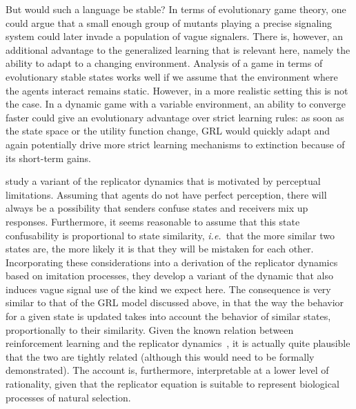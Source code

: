 \documentclass[a4paper]{article}
\begin{document}
But would such a language be stable?
In terms of evolutionary game theory, one could argue that a small enough group of mutants playing a precise signaling system could later invade a population of vague signalers.
There is, however, an additional advantage to the generalized learning that is relevant here, namely the ability to adapt to a changing environment.
Analysis of a game in terms of evolutionary stable states works well if we assume that the environment where the agents interact remains static.
However, in a more realistic setting this is not the case.
In a dynamic game with a variable environment, an ability to converge faster could give an evolutionary advantage over strict learning rules: as soon as the state space or the utility function change, GRL would quickly adapt and again potentially drive more strict learning mechanisms to extinction because of its short-term gains.


\textcite{franke_vagueness_2017} study a variant of the replicator dynamics that is motivated by perceptual limitations.
Assuming that agents do not have perfect perception, there will always be a possibility that senders confuse states and receivers mix up responses.
Furthermore, it seems reasonable to assume that this state confusability is proportional to state similarity, \emph{i.e.}~that the more similar two states are, the more likely it is that they will be mistaken for each other.
Incorporating these considerations into a derivation of the replicator dynamics based on imitation processes, they develop a variant of the dynamic that also induces vague signal use of the kind we expect here.
The consequence is very similar to that of the GRL model discussed above, in that the way the behavior for a given state is updated takes into account the behavior of similar states, proportionally to their similarity.
Given the known relation between reinforcement learning and the replicator dynamics~\parencite{Beggs2005}, it is actually quite plausible that the two are tightly related (although this would need to be formally demonstrated).
The account is, furthermore, interpretable at a lower level of rationality, given that the replicator equation is suitable to represent biological processes of natural selection.
\end{document}
